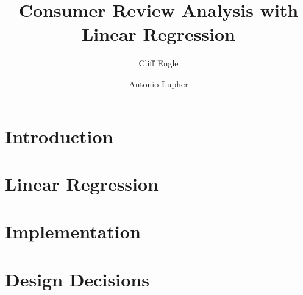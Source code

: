 \documentclass{article}
\title{Consumer Review Analysis with Linear Regression}
\author{Cliff Engle \and Antonio Lupher}
\begin{document}

\maketitle

\section{Introduction}


\section{Linear Regression}


\section{Implementation}

\section{Design Decisions}
\end{document}

